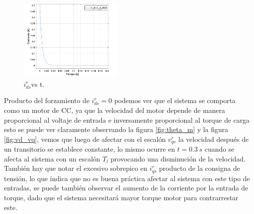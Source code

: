 \documentclass[10pt]{article}
\begin{document}
\begin{itemize}
	\begin{figure}[h!]
	\centering
	\includegraphics[width=0.45\textwidth]{ids.png}
	\caption{\label{fig:ids} $i^{r}_{ds}$vs t.}
	\end{figure}
	Producto del forzamiento de $i^{r}_{ds}=0$ podemos ver que el sistema se comporta como un motor de CC, ya que la velocidad del motor depende de manera proporcional al voltaje de entrada e inversamente proporcional al torque de carga esto se puede ver claramente observando la figura \ref{fig:theta_m} y la figura \ref{fig:vd_vq}, vemos que luego de afectar con el escalón $v^{r}_{qs}$ la velocidad después de un transitorio se establece constante, lo mismo ocurre en $t=0.3\ s$ cuando se afecta al sistema con un escalón $T_{l}$ provocando una disminución de la velocidad.
	También hay que notar el excesivo sobrepico en $i^{r}_{qs}$ producto de la consigna de tensión, lo que indica que no es buena práctica afectar al sistema con este tipo de entradas, se puede también observar el aumento de la corriente por la entrada de torque, dado que el sistema necesitará mayor torque motor para contrarrestar este.\\
	

\end{itemize}
\end{document}
